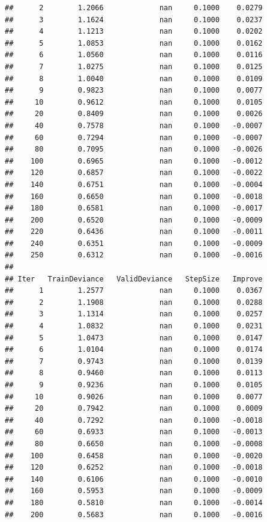 \documentclass[
]{book}
\begin{document}
\begin{verbatim}
##      2        1.2066             nan     0.1000    0.0279
##      3        1.1624             nan     0.1000    0.0237
##      4        1.1213             nan     0.1000    0.0202
##      5        1.0853             nan     0.1000    0.0162
##      6        1.0560             nan     0.1000    0.0116
##      7        1.0275             nan     0.1000    0.0125
##      8        1.0040             nan     0.1000    0.0109
##      9        0.9823             nan     0.1000    0.0077
##     10        0.9612             nan     0.1000    0.0105
##     20        0.8409             nan     0.1000    0.0026
##     40        0.7578             nan     0.1000   -0.0007
##     60        0.7294             nan     0.1000   -0.0007
##     80        0.7095             nan     0.1000   -0.0026
##    100        0.6965             nan     0.1000   -0.0012
##    120        0.6857             nan     0.1000   -0.0022
##    140        0.6751             nan     0.1000   -0.0004
##    160        0.6650             nan     0.1000   -0.0018
##    180        0.6581             nan     0.1000   -0.0017
##    200        0.6520             nan     0.1000   -0.0009
##    220        0.6436             nan     0.1000   -0.0011
##    240        0.6351             nan     0.1000   -0.0009
##    250        0.6312             nan     0.1000   -0.0016
## 
## Iter   TrainDeviance   ValidDeviance   StepSize   Improve
##      1        1.2577             nan     0.1000    0.0367
##      2        1.1908             nan     0.1000    0.0288
##      3        1.1314             nan     0.1000    0.0257
##      4        1.0832             nan     0.1000    0.0231
##      5        1.0473             nan     0.1000    0.0147
##      6        1.0104             nan     0.1000    0.0174
##      7        0.9743             nan     0.1000    0.0139
##      8        0.9460             nan     0.1000    0.0113
##      9        0.9236             nan     0.1000    0.0105
##     10        0.9026             nan     0.1000    0.0077
##     20        0.7942             nan     0.1000    0.0009
##     40        0.7292             nan     0.1000   -0.0018
##     60        0.6933             nan     0.1000   -0.0013
##     80        0.6650             nan     0.1000   -0.0008
##    100        0.6458             nan     0.1000   -0.0020
##    120        0.6252             nan     0.1000   -0.0018
##    140        0.6106             nan     0.1000   -0.0010
##    160        0.5953             nan     0.1000   -0.0009
##    180        0.5810             nan     0.1000   -0.0014
##    200        0.5683             nan     0.1000   -0.0016

\end{verbatim}
\end{document}
